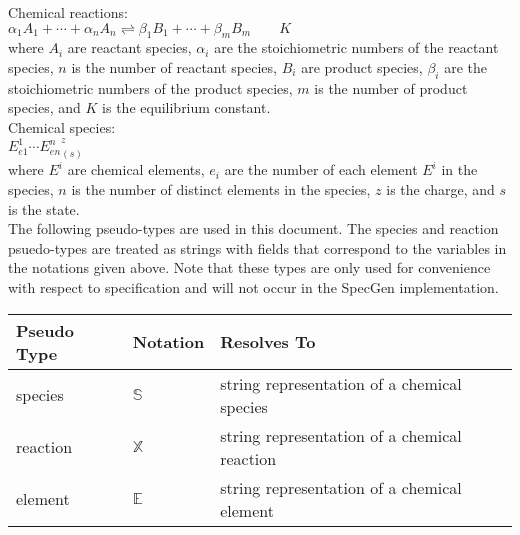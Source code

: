 \documentclass[12pt, titlepage]{article}
\newcommand{\progname}{SpecGen}
\begin{document}
\noindent
Chemical reactions:\\

${\alpha}_1 {A}_{1} + \cdots + {\alpha}_n {A}_{n} 
    \rightleftharpoons {\beta}_1 {B}_{1} + \cdots + {\beta}_m {B}_{m} \qquad K$\\

where $A_i$ are reactant species, $\alpha_i$ are the stoichiometric numbers
of the reactant species, $n$ is the number of reactant species, $B_i$ are product species,
$\beta_i$ are the stoichiometric numbers of the product species, $m$ is the number of
product species, and $K$ is the equilibrium constant.\\

\noindent
Chemical species:\\

${{E}^1_{e1}}\cdots{{E}^n_{en}}^{z}_{(s)}$\\

where $E^i$ are chemical elements, $e_i$ are the number of each element
$E^i$ in the species, $n$ is the number of distinct elements in the species,
$z$ is the charge, and $s$ is the state.\\

\noindent
The following pseudo-types are used in this document.  The species and 
reaction psuedo-types are treated as strings with fields that correspond to the variables
in the notations given above.  Note that these types are only used for convenience with
respect to specification and
will not occur in the \progname{} implementation.

\begin{center}
\renewcommand{\arraystretch}{1.2}
\noindent 
\begin{tabular}{l l p{7.5cm}} 
\toprule 
\textbf{Pseudo Type} & \textbf{Notation} & \textbf{Resolves To}\\ 
\midrule
species & $\mathbb{S}$ & string representation of a chemical species\\
reaction & $\mathbb{X}$ & string representation of a chemical reaction \\
element & $\mathbb{E}$ & string representation of a chemical element \\
\bottomrule
\end{tabular} 
\end{center}
\end{document}
